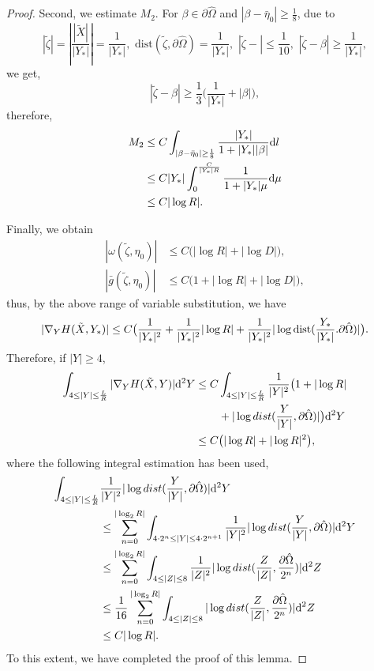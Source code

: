 \documentclass[11pt,reqno]{amsart}%
\theoremstyle{definition}
\theoremstyle{remark}
\begin{document}
\begin{proof}
Second, we estimate  $M_{2}$.  For $\beta\in \partial\hat{\Omega}$ and $|\beta-\bar{\eta}_{0}|\geq\frac{1}{8}$, due to
$$|\tilde{\zeta}|=|\frac{|\tilde{X}|}{|Y_{*}|}|=\frac{1}{|Y_{*}|},\,\,\text{dist}(\tilde{\zeta},\partial\hat{\Omega})=\frac{1}{|Y_{*}|},\,\,
|\tilde{\zeta}-|\leq\frac{1}{10},\,\, |\tilde{\zeta}-\beta|\geq \frac{1}{|Y_{*}|} ,$$
we get,
$$|\tilde{\zeta}-\beta|\geq \frac{1}{3}\big(\frac{1}{|Y_{*}|}+|\beta|\big),$$
therefore,
\begin{align}
M_{2}&\leq C\int_{|\beta-\bar{\eta}_{0}|\geq\frac{1}{8}}\frac{|Y_{*}|}{1+|Y_{*}||\beta|}{\rm d}l\nonumber\\
&\leq C|Y_{*}|\int^{\frac{C}{|Y_{*}|R}}_{0}\frac{1}{1+|Y_{*}|\mu}{\rm d}\mu\nonumber\\
&\leq C |\log R|.\nonumber
\end{align}

Finally, we obtain
\begin{align}
|\omega(\tilde{\zeta},\eta_{0})|&\leq C\big(|\log R|+|\log D|\big),\nonumber\\
|\bar{g}(\tilde{\zeta},\eta_{0})|&\leq C\big(1+|\log R|+|\log D|\big),\nonumber
\end{align}
thus, by the above range of variable substitution, we have
\begin{align}
|\nabla_{Y}H(\tilde{X},Y_{*})|\leq C\big(\frac{1}{|Y_{*}|^{2}}+\frac{1}{|Y_{*}|^{2}}|\log R|+\frac{1}{|Y_{*}|^{2}}|\log {\rm dist}(\frac{Y_{*}}{|Y_{*}|}.\partial\hat{\Omega}) |\big).\nonumber
\end{align}
Therefore,  if $|Y|\geq 4$,
\begin{align}
\int_{4\leq |Y|\leq \frac{L}{R}}|\nabla_{Y}H(\tilde{X},Y)|{\rm d}^{2}Y
 \leq C & \int_{4\leq |Y|\leq \frac{L}{R}}\frac{1}{|Y|^{2}}\big(1+|\log R| \nonumber\\
&+|\log dist(\frac{Y}{|Y|},\partial\hat{\Omega})|\big) {\rm d}^{2}Y \nonumber\\
\leq C & \big(|\log R|+|\log R|^{2}\big),\nonumber
\end{align}
where the following integral estimation has been used,
\begin{align}
\int_{4\leq |Y|\leq \frac{L}{R}}&\frac{1}{|Y|^{2}}|\log dist(\frac{Y}{|Y|},\partial\hat{\Omega})|{\rm d}^{2}Y \nonumber\\
&\leq\sum^{|\log_{2}R|}_{n=0}\int_{4\cdot 2^{n}\leq |Y|\leq 4\cdot 2^{n+1} }\frac{1}{|Y|^{2}}|\log dist(\frac{Y}{|Y|},\partial\hat{\Omega})|{\rm d}^{2}Y \nonumber\\
&\leq\sum^{|\log_{2}R|}_{n=0}\int_{4\leq |Z|\leq 8 }\frac{1}{|Z|^{2}}|\log dist(\frac{Z}{|Z|},\frac{\partial\hat{\Omega}}{2^{n}})|{\rm d}^{2}Z \nonumber\\
&\leq \frac{1}{16}\sum^{|\log_{2}R|}_{n=0}\int_{4\leq |Z|\leq 8 }|\log dist(\frac{Z}{|Z|},\frac{\partial\hat{\Omega}}{2^{n}})|{\rm d}^{2}Z \nonumber\\
&\leq C|\log R|.\nonumber
\end{align}
To this extent, we have completed the proof of this lemma.
\end{proof}
\end{document}
